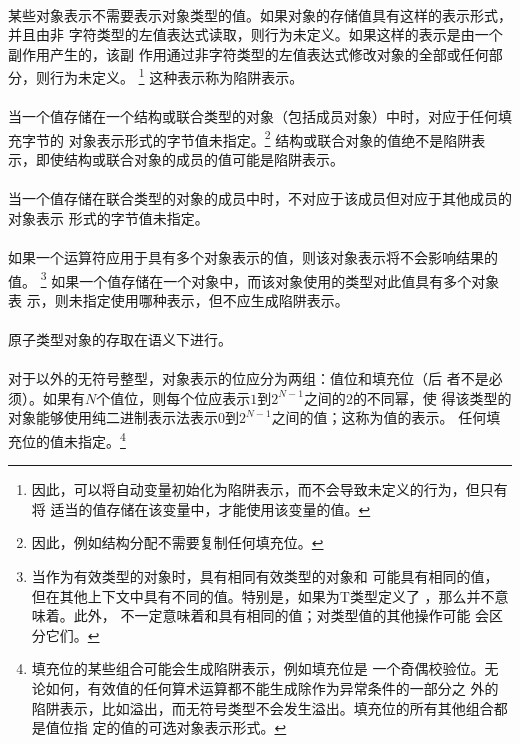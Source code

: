 {\paragraph{}
某些对象表示不需要表示对象类型的值。如果对象的存储值具有这样的表示形式，并且由非
字符类型的左值表达式读取，则行为未定义。如果这样的表示是由一个副作用产生的，该副
作用通过非字符类型的左值表达式修改对象的全部或任何部分，则行为未定义。
\footnote{因此，可以将自动变量初始化为陷阱表示，而不会导致未定义的行为，但只有将
适当的值存储在该变量中，才能使用该变量的值。} 这种表示称为陷阱表示。

\paragraph{}
当一个值存储在一个结构或联合类型的对象（包括成员对象）中时，对应于任何填充字节的
对象表示形式的字节值未指定。\footnote{因此，例如结构分配不需要复制任何填充位。}
结构或联合对象的值绝不是陷阱表示，即使结构或联合对象的成员的值可能是陷阱表示。

\paragraph{}
当一个值存储在联合类型的对象的成员中时，不对应于该成员但对应于其他成员的对象表示
形式的字节值未指定。

\paragraph{}
如果一个运算符应用于具有多个对象表示的值，则该对象表示将不会影响结果的值。
\footnote{当作为有效类型的对象时，具有相同有效类型的对象和
可能具有相同的值，但在其他上下文中具有不同的值。特别是，如果为T类型定义了
\tm{==}，那么并不意味着。此外，
不一定意味着和具有相同的值；对类型值的其他操作可能
会区分它们。} 如果一个值存储在一个对象中，而该对象使用的类型对此值具有多个对象表
示，则未指定使用哪种表示，但不应生成陷阱表示。

\paragraph{}
原子类型对象的存取在语义下进行。


\paragraph{}
对于以外的无符号整型，对象表示的位应分为两组：值位和填充位（后
者不是必须）。如果有$N$个值位，则每个位应表示$1$到$2^{N-1}$之间的$2$的不同幂，使
得该类型的对象能够使用纯二进制表示法表示$0$到$2^{N-1}$之间的值；这称为值的表示。
任何填充位的值未指定。\footnote{填充位的某些组合可能会生成陷阱表示，例如填充位是
一个奇偶校验位。无论如何，有效值的任何算术运算都不能生成除作为异常条件的一部分之
外的陷阱表示，比如溢出，而无符号类型不会发生溢出。填充位的所有其他组合都是值位指
定的值的可选对象表示形式。}

}
